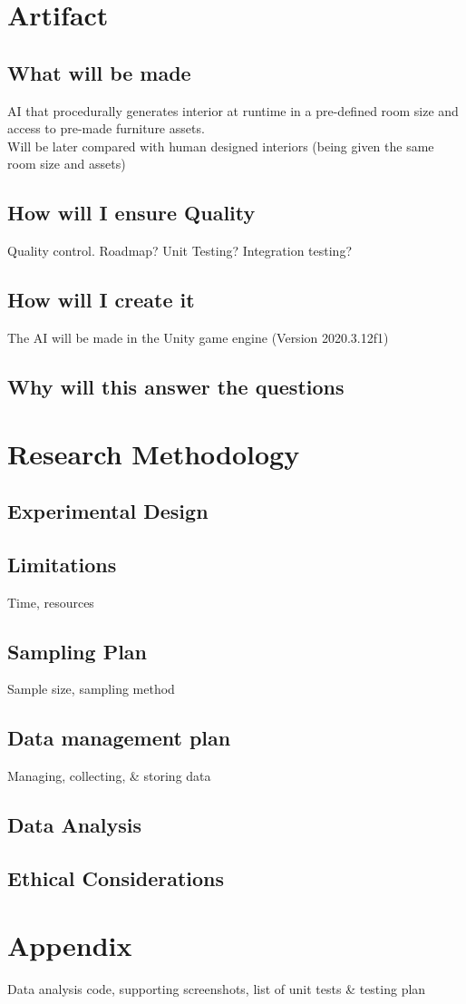 \documentclass[lettersize,journal]{IEEEtran}
\begin{document}
\section{Artifact}
    \subsection{What will be made}
        AI that procedurally generates interior at runtime in a pre-defined room size and access to pre-made furniture assets. \\
        Will be later compared with human designed interiors (being given the same room size and assets)


    \subsection{How will I ensure Quality}
        Quality control. Roadmap? Unit Testing? Integration testing?

    \subsection{How will I create it}
        The AI will be made in the Unity game engine (Version 2020.3.12f1)

    \subsection{Why will this answer the questions}

\section{Research Methodology}
    \subsection{Experimental Design}

    \subsection{Limitations}
        Time, resources

    \subsection{Sampling Plan}
        Sample size, sampling method

    \subsection{Data management plan}
        Managing, collecting, \& storing data

    \subsection{Data Analysis}

    \subsection{Ethical Considerations}

\section{Appendix}
    Data analysis code, supporting screenshots, list of unit tests \& testing plan



\end{document}

